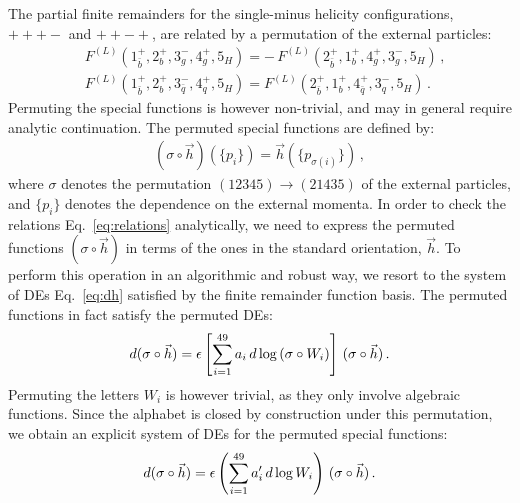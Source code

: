 \documentclass[main.tex]{subfiles}
\begin{document}
The partial finite remainders for the single-minus helicity configurations, $+++-$ and $++-+$, are related by a permutation of the external particles:
\begin{equation} \label{eq:relations}
\begin{aligned} 
 & F^{(L)}(1^+_{\bar{b}},2^+_{b},3^-_g,4^+_g,5_{H}) = - \, F^{(L)}(2^+_{\bar{b}},1^+_{b},4^+_g,3^-_g,5_{H}) \,, \\
 & F^{(L)}(1^+_{\bar{b}},2^+_{b},3^-_{\bar{q}},4^+_q,5_{H}) = F^{(L)}(2^+_{\bar{b}},1^+_{b},4^+_{\bar{q}},3^-_q,5_{H}) \,.
\end{aligned}
\end{equation}
Permuting the special functions is however non-trivial, and may in general require analytic continuation. The permuted special functions are defined by:
\begin{align}
\left(\sigma \circ \vec{h} \right) (\{p_i\}) = \vec{h} ( \{p_{\sigma(i)}\} )\, ,
\end{align}
where $\sigma$ denotes the permutation $(12345)\to(21435)$ of the external particles, and $\{p_i\}$ denotes the dependence on the external momenta. In order to check the relations Eq.~\ref{eq:relations} analytically, we need to express the permuted functions $(\sigma \circ \vec{h} )$ in terms of the ones in the standard orientation, $\vec{h}$. To perform this operation in an algorithmic and robust way, we resort to the system of DEs Eq.~\ref{eq:dh} satisfied by the finite remainder function basis. The permuted functions in fact satisfy the permuted DEs:
\begin{align}
d ( \sigma \circ \vec{h} ) = \epsilon \left[ \sum_{i=1}^{49} a_i \, d \log\left(\sigma \circ W_i \right) \right] \,  ( \sigma \circ \vec{h} ) \,.
\end{align}
Permuting the letters $W_i$ is however trivial, as they only involve algebraic functions. Since the alphabet is closed by construction under this permutation, we obtain an explicit system of DEs for the permuted special functions:
\begin{align} \label{eq:dsigmah}
d ( \sigma \circ \vec{h} ) = \epsilon \left( \sum_{i=1}^{49} a_i' \, d \log W_i  \right) \,  ( \sigma \circ \vec{h} ) \,.
\end{align}
\end{document}
